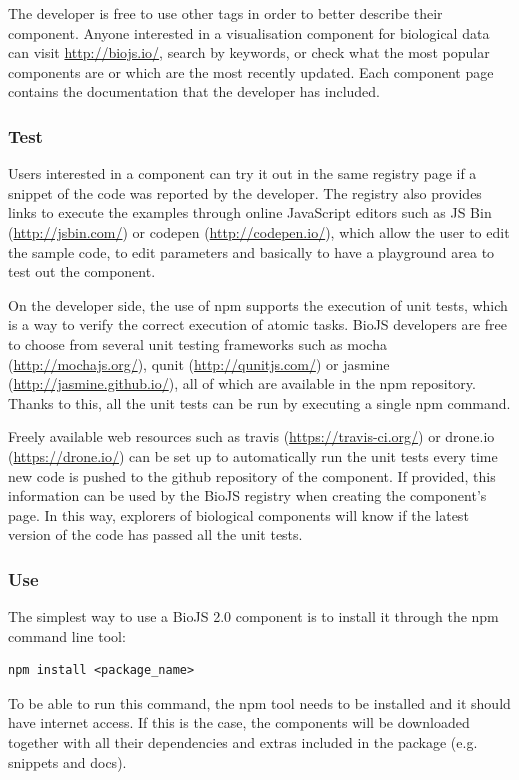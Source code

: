 The developer is free to use other tags in order to better describe their component. Anyone interested in a visualisation component for biological data can visit \url{http://biojs.io/}, search by keywords, or check what the most popular components are or which are the most recently updated. Each component page contains the documentation that the developer has included.

\subsubsection{Test}
Users interested in a component can try it out in the same registry page if a snippet of the code was reported by the developer. The registry also provides links to execute the examples through online JavaScript editors such as JS Bin (\url{http://jsbin.com/}) or codepen (\url{http://codepen.io/}), which allow the user to edit the sample code, to edit parameters and basically to have a playground area to test out the component.

On the developer side, the use of npm supports the execution of unit tests, which is a way to verify the correct execution of atomic tasks. BioJS developers are free to choose from several unit testing frameworks such as mocha (\url{http://mochajs.org/}), qunit (\url{http://qunitjs.com/}) or jasmine (\url{http://jasmine.github.io/}), all of which are available in the npm repository. Thanks to this, all the unit tests can be run by executing a single npm command. 

Freely available web resources such as travis (\url{https://travis-ci.org/}) or drone.io (\url{https://drone.io/}) can be set up to automatically run the unit tests every time new code is pushed to the github repository of the component. If provided, this information can be used by the BioJS registry when creating the component's page. In this way, explorers of biological components will know if the latest version of the code has passed all the unit tests.

\subsubsection{Use}
The simplest way to use a BioJS 2.0 component is to install it through the npm command line tool:
\begin{lstlisting}
npm install <package_name>
\end{lstlisting}

To be able to run this command, the npm tool needs to be installed and it should have internet access. If this is the case, the components will be downloaded together with all their dependencies and extras included in the package (e.g. snippets and docs). 

